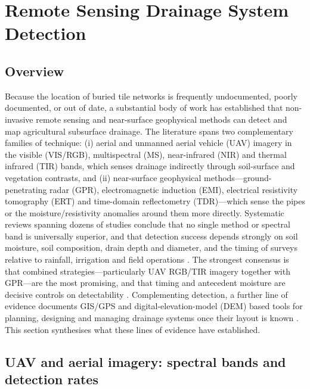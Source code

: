 \documentclass[11pt]{article}
\begin{document}
\section*{Remote Sensing Drainage System Detection}

\subsection{Overview}

Because the location of buried tile networks is frequently undocumented, poorly documented, or out of date, a substantial body of work has established that non-invasive remote sensing and near-surface geophysical methods can detect and map agricultural subsurface drainage. The literature spans two complementary families of technique: (i) aerial and unmanned aerial vehicle (UAV) imagery in the visible (VIS/RGB), multispectral (MS), near-infrared (NIR) and thermal infrared (TIR) bands, which senses drainage indirectly through soil-surface and vegetation contrasts, and (ii) near-surface geophysical methods---ground-penetrating radar (GPR), electromagnetic induction (EMI), electrical resistivity tomography (ERT) and time-domain reflectometry (TDR)---which sense the pipes or the moisture/resistivity anomalies around them more directly. Systematic reviews spanning dozens of studies conclude that no single method or spectral band is universally superior, and that detection success depends strongly on soil moisture, soil composition, drain depth and diameter, and the timing of surveys relative to rainfall, irrigation and field operations \parencite{Carlsen2024,Wienken2024}. The strongest consensus is that combined strategies---particularly UAV RGB/TIR imagery together with GPR---are the most promising, and that timing and antecedent moisture are decisive controls on detectability \parencite{Wienken2024,Carlsen2024,Koganti2021}. Complementing detection, a further line of evidence documents GIS/GPS and digital-elevation-model (DEM) based tools for planning, designing and managing drainage systems once their layout is known \parencite{Shedekar2018,Falasy2024,Falasy2025,Falasy2025b}. This section synthesises what these lines of evidence have established.

\subsection{UAV and aerial imagery: spectral bands and detection rates}
\end{document}
